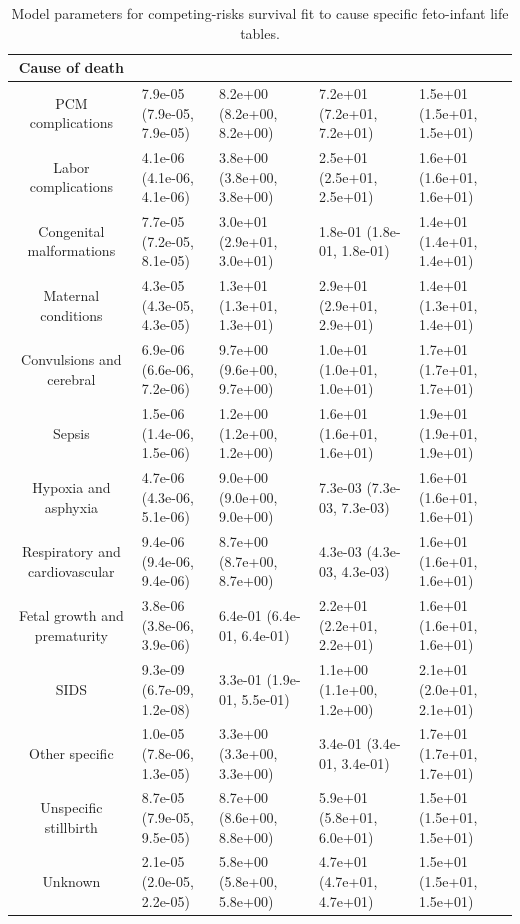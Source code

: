 \begin{table}[t]
\caption*{
{\fontsize{20}{25}\selectfont  Model parameters for competing-risks survival fit to cause specific feto-infant life tables.\fontsize{12}{15}\selectfont }
} 
\fontsize{12.0pt}{14.0pt}\selectfont
\begin{tabular*}{\linewidth}{@{\extracolsep{\fill}}cllll}
\toprule
Cause of death &  &  &  &  \\ 
\midrule\addlinespace[2.5pt]
PCM complications & 7.9e-05 (7.9e-05, 7.9e-05) & 8.2e+00 (8.2e+00, 8.2e+00) & 7.2e+01 (7.2e+01, 7.2e+01) & 1.5e+01 (1.5e+01, 1.5e+01) \\ 
Labor complications & 4.1e-06 (4.1e-06, 4.1e-06) & 3.8e+00 (3.8e+00, 3.8e+00) & 2.5e+01 (2.5e+01, 2.5e+01) & 1.6e+01 (1.6e+01, 1.6e+01) \\ 
Congenital malformations & 7.7e-05 (7.2e-05, 8.1e-05) & 3.0e+01 (2.9e+01, 3.0e+01) & 1.8e-01 (1.8e-01, 1.8e-01) & 1.4e+01 (1.4e+01, 1.4e+01) \\ 
Maternal conditions & 4.3e-05 (4.3e-05, 4.3e-05) & 1.3e+01 (1.3e+01, 1.3e+01) & 2.9e+01 (2.9e+01, 2.9e+01) & 1.4e+01 (1.3e+01, 1.4e+01) \\ 
Convulsions and cerebral & 6.9e-06 (6.6e-06, 7.2e-06) & 9.7e+00 (9.6e+00, 9.7e+00) & 1.0e+01 (1.0e+01, 1.0e+01) & 1.7e+01 (1.7e+01, 1.7e+01) \\ 
Sepsis & 1.5e-06 (1.4e-06, 1.5e-06) & 1.2e+00 (1.2e+00, 1.2e+00) & 1.6e+01 (1.6e+01, 1.6e+01) & 1.9e+01 (1.9e+01, 1.9e+01) \\ 
Hypoxia and asphyxia & 4.7e-06 (4.3e-06, 5.1e-06) & 9.0e+00 (9.0e+00, 9.0e+00) & 7.3e-03 (7.3e-03, 7.3e-03) & 1.6e+01 (1.6e+01, 1.6e+01) \\ 
Respiratory and cardiovascular & 9.4e-06 (9.4e-06, 9.4e-06) & 8.7e+00 (8.7e+00, 8.7e+00) & 4.3e-03 (4.3e-03, 4.3e-03) & 1.6e+01 (1.6e+01, 1.6e+01) \\ 
Fetal growth and prematurity & 3.8e-06 (3.8e-06, 3.9e-06) & 6.4e-01 (6.4e-01, 6.4e-01) & 2.2e+01 (2.2e+01, 2.2e+01) & 1.6e+01 (1.6e+01, 1.6e+01) \\ 
SIDS & 9.3e-09 (6.7e-09, 1.2e-08) & 3.3e-01 (1.9e-01, 5.5e-01) & 1.1e+00 (1.1e+00, 1.2e+00) & 2.1e+01 (2.0e+01, 2.1e+01) \\ 
Other specific & 1.0e-05 (7.8e-06, 1.3e-05) & 3.3e+00 (3.3e+00, 3.3e+00) & 3.4e-01 (3.4e-01, 3.4e-01) & 1.7e+01 (1.7e+01, 1.7e+01) \\ 
Unspecific stillbirth & 8.7e-05 (7.9e-05, 9.5e-05) & 8.7e+00 (8.6e+00, 8.8e+00) & 5.9e+01 (5.8e+01, 6.0e+01) & 1.5e+01 (1.5e+01, 1.5e+01) \\ 
Unknown & 2.1e-05 (2.0e-05, 2.2e-05) & 5.8e+00 (5.8e+00, 5.8e+00) & 4.7e+01 (4.7e+01, 4.7e+01) & 1.5e+01 (1.5e+01, 1.5e+01) \\ 
\bottomrule
\end{tabular*}
\end{table}

